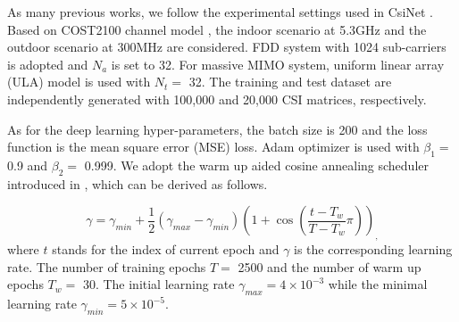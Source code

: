 \documentclass[12pt, draftclsnofoot, onecolumn]{IEEEtran}
\begin{document}
As many previous works, we follow the experimental settings used in CsiNet \cite{wen2018deep}. Based on COST2100 channel model \cite{liu2012cost}, the indoor scenario at 5.3GHz and the outdoor scenario at 300MHz are considered. FDD system with 1024 sub-carriers is adopted and $N_a$ is set to 32. For massive MIMO system, uniform linear array (ULA) model is used with $N_t=$ 32. The training and test dataset are independently generated with 100,000 and 20,000 CSI matrices, respectively.

As for the deep learning hyper-parameters, the batch size is 200 and the loss function is the mean square error (MSE) loss. Adam optimizer is used with $\beta_1=$ 0.9 and $\beta_2=$ 0.999. We adopt the warm up aided cosine annealing scheduler introduced in \cite{lu2020multi}, which can be derived as follows.

\begin{equation}
  \gamma = \gamma_{min} + \frac{1}{2}\left(\gamma_{max} - \gamma_{min}\right)\left(1 + \cos \left( \frac{t-T_w}{T-T_w} \pi \right)\right)_,
\end{equation}
where $t$ stands for the index of current epoch and $\gamma$ is the corresponding learning rate. The number of training epochs $T=$ 2500 and the number of warm up epochs $T_w=$ 30. The initial learning rate $\gamma_{max}=4\times 10^{-3}$ while the minimal learning rate $\gamma_{min}=5\times 10^{-5}$.
\end{document}
